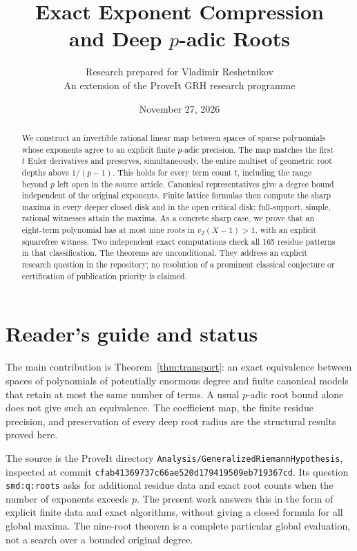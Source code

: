 
\title{Exact Exponent Compression\\and Deep $p$-adic Roots}
\author{Research prepared for Vladimir Reshetnikov\\\small An extension of the ProveIt GRH research programme}
\date{November 27, 2026}

\maketitle
\begin{abstract}
We construct an invertible rational linear map between spaces of sparse
polynomials whose exponents agree to an explicit finite $p$-adic precision.
The map matches the first $t$ Euler derivatives and preserves, simultaneously,
the entire multiset of geometric root depths above $1/(p-1)$. This holds for
every term count $t$, including the range beyond $p$ left open in the source
article. Canonical representatives give a degree bound independent of the
original exponents. Finite lattice formulas then compute the sharp maxima
in every deeper closed disk and in the open critical disk; full-support,
simple, rational witnesses attain the maxima. As a concrete sharp case,
we prove that an eight-term polynomial has at most nine roots in
$v_2(X-1)>1$, with an explicit squarefree witness. Two independent exact
computations check all 165 residue patterns in that classification. The
theorems are unconditional. They address an explicit research question in
the repository; no resolution of a prominent classical conjecture or
certification of publication priority is claimed.
\end{abstract}
{\setlength{\parskip}{0pt}\tableofcontents}
\clearpage
\section*{Reader's guide and status}
The main contribution is Theorem~\ref{thm:transport}: an exact equivalence
between spaces of polynomials of potentially enormous degree and finite
canonical models that retain at most the same number of terms. A usual
$p$-adic root bound alone does not give such an equivalence. The coefficient
map, the finite residue precision, and preservation of every deep root
radius are the structural results proved here.

The source is the ProveIt directory
\texttt{Analysis/GeneralizedRiemannHypothesis}, inspected at commit
\texttt{cfab41369737c66ae520d179419509eb719367cd}. Its question
\texttt{smd:q:roots} asks for additional residue data and exact root counts
when the number of exponents exceeds $p$. The present work answers this
in the form of explicit finite data and exact algorithms, without giving
a closed formula for all global maxima. The nine-root theorem is a complete
particular global evaluation, not a search over a bounded original degree.

